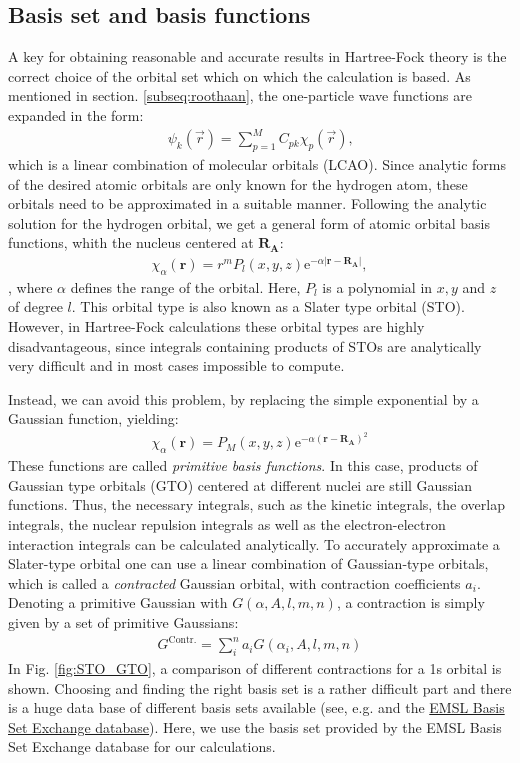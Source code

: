 \documentclass[twoside,        %
			   12pt,			%
               BCOR10mm,       %
               ngerman,english  %
               ]{scrartcl}
\begin{document}
\subsection{Basis set and basis functions}
A key for obtaining reasonable and accurate results in Hartree-Fock theory is the correct choice of the orbital set which on which the calculation is based. As mentioned in section. \ref{subseq:roothaan}, the one-particle wave functions are expanded in the form:
\begin{align*}
    \psi_k(\vec{r}) = \sum_{p=1}^M C_{pk} \chi_p (\vec{r})\text{,}
\end{align*} which is a linear combination of molecular orbitals (LCAO).
Since analytic forms of the desired atomic orbitals are only known for the hydrogen atom, these orbitals need to be approximated in a suitable manner. Following the analytic solution for the hydrogen orbital, we get a general form of atomic orbital basis functions, whith the nucleus centered at $\mathbf{R_\text{A}}$:
\begin{align*}
\chi_\alpha (\mathbf{r}) = r^m P_l (x,y,z) \text{e}^{-\alpha |\mathbf{r-R_\text{A}}|},
\end{align*}, where $\alpha$ defines the range of the orbital. Here, $P_l$ is a polynomial in $x,y$ and $z$ of degree $l$. This orbital type is also known as a Slater type orbital (STO). However, in Hartree-Fock calculations these orbital types are highly disadvantageous, since integrals containing products of STOs are analytically very difficult and in most cases impossible to compute.

Instead, we can avoid this problem, by replacing the simple exponential by a Gaussian function, yielding:
\begin{align*}
\chi_\alpha(\mathbf{r}) = P_M (x,y,z) \text{e}^{-\alpha (\mathbf{r-R_\text{A}})^2}
\end{align*} These functions are called \emph{primitive basis functions}. In this case, products of Gaussian type orbitals (GTO) centered at different nuclei are still Gaussian functions. Thus, the necessary integrals, such as the kinetic integrals, the overlap integrals, the nuclear repulsion integrals as well as the electron-electron interaction integrals can be calculated analytically.
To accurately approximate a Slater-type orbital one can use a linear combination of Gaussian-type orbitals, which is called a \emph{contracted} Gaussian orbital, with contraction coefficients $a_i$. Denoting a primitive Gaussian with $G(\alpha, A, l, m, n)$, a contraction is simply given by a set of primitive Gaussians:
\begin{align*}
G^\text{Contr.} = \sum\limits_i^n a_i G(\alpha_i, A, l, m, n)
\end{align*} 
In Fig. \ref{fig:STO_GTO}, a comparison of different contractions for a 1s orbital is shown. Choosing and finding the right basis set is a rather difficult part and there is a huge data base of different basis sets available (see, e.g. \cite{schuchardt2007basis, feller1996role} and the \href{https://bse.pnl.gov/}{EMSL Basis Set Exchange database}). Here, we use the basis set provided by the EMSL Basis Set Exchange database for our calculations.
\end{document}
